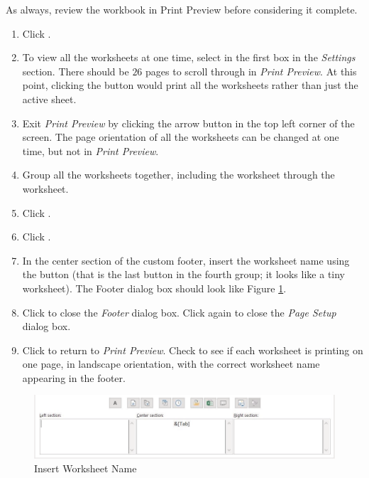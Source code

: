 As always, review the workbook in Print Preview before considering it complete.
\begin{enumerate}
	\item Click .
	\item To view all the worksheets at one time, select  in the first box in the \textit{Settings} section. There should be $ 26 $ pages to scroll through in \textit{Print Preview}. At this point, clicking the  button would print all the worksheets rather than just the active sheet.
	\item Exit \textit{Print Preview} by clicking the arrow button in the top left corner of the screen. The page orientation of all the worksheets can be changed at one time, but not in \textit{Print Preview}.
	\item Group all the worksheets together, including the  worksheet through the  worksheet.
	\item Click .
	\item Click .
	\item In the center section of the custom footer, insert the worksheet name using the  button (that is the last button in the fourth group; it looks like a tiny worksheet). The Footer dialog box should look like Figure \ref{06:fig15}.
	\item Click  to close the \textit{Footer} dialog box. Click  again to close the \textit{Page Setup} dialog box.
	\item Click  to return to \textit{Print Preview}. Check to see if each worksheet is printing on one page, in landscape orientation, with the correct worksheet name appearing in the footer.
\end{enumerate}

\begin{figure}[H]
	\centering
	\includegraphics[width=\maxwidth{.95\linewidth}]{gfx/ch06_fig15}
	\caption{Insert Worksheet Name}
	\label{06:fig15}
\end{figure}

